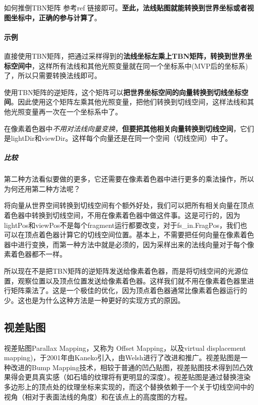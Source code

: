 \documentclass[UTF8,a4paper,12pt]{ctexbook}
\begin{document}
					如何推倒TBN矩阵 参考ref 链接即可。\textbf{至此，法线贴图就能转换到世界坐标或者视图坐标中，正确的参与计算了}。
				
					
			\paragraph{示例}
			
				直接使用TBN矩阵，把通过采样得到的\textbf{法线坐标左乘上TBN矩阵，转换到世界坐标空间中}，这样所有法线和其他光照变量就在同一个坐标系中(MVP后的坐标系)了，所以只需要转换法线即可。
				
				 使用TBN矩阵的逆矩阵，这个矩阵可以\textbf{把世界坐标空间的向量转换到切线坐标空间}。因此使用这个矩阵左乘其他光照变量，把他们转换到切线空间，这样法线和其他光照变量再一次在一个坐标系中了。
				 
				 在像素着色器中\textit{不用对法线向量变换}，\textbf{但要把其他相关向量转换到切线空间}，它们是lightDir和viewDir。这样每个向量还是在同一个空间（切线空间）中了。
				 
				
				
				\subparagraph{比较}
					第二种方法看似要做的更多，它还需要在像素着色器中进行更多的乘法操作，所以为何还用第二种方法呢？
					
					将向量从世界空间转换到切线空间有个额外好处，我们可以把所有相关向量在顶点着色器中转换到切线空间，不用在像素着色器中做这件事。这是可行的，因为lightPos和viewPos不是每个fragment运行都要改变，对于fs\_in.FragPos，我们也可以在顶点着色器计算它的切线空间位置。基本上，不需要把任何向量在像素着色器中进行变换，而第一种方法中就是必须的，因为采样出来的法线向量对于每个像素着色器都不一样。
					
					所以现在不是把TBN矩阵的逆矩阵发送给像素着色器，而是将切线空间的光源位置，观察位置以及顶点位置发送给像素着色器。这样我们就不用在像素着色器里进行矩阵乘法了。这是一个极佳的优化，因为顶点着色器通常比像素着色器运行的少。这也是为什么这种方法是一种更好的实现方式的原因。
					
					
			
		\subsection{视差贴图}
			视差贴图Parallax Mapping，又称为 Offset Mapping，以及virtual displacement mapping)，于2001年由Kaneko引入，由Welsh进行了改进和推广。视差贴图是一种改进的Bump Mapping技术，相较于普通的凹凸贴图，视差贴图技术得到凹凸效果得会更具真实感（如石墙的纹理将有更明显的深度）。视差贴图是通过替换渲染多边形上的顶点处的纹理坐标来实现的，而这个替换依赖于一个关于切线空间中的视角（相对于表面法线的角度）和在该点上的高度图的方程。
			
\end{document}
